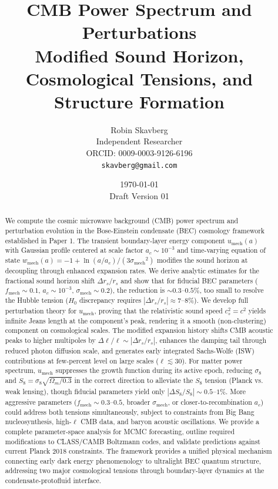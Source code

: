 \documentclass[11pt,a4paper]{article}
\title{\textbf{CMB Power Spectrum and Perturbations}\\[0.5em]
\large Modified Sound Horizon, Cosmological Tensions, and Structure Formation}
\author{Robin Skavberg\\[0.3em]
\small Independent Researcher\\
\small ORCID: 0009-0003-9126-6196\\
\small \texttt{skavberg@gmail.com}}
\date{\today\\[0.5em]
\small Draft Version 01}
\newcommand{\umech}{\ensuremath{u_{\mathrm{mech}}}}
\newcommand{\wmech}{\ensuremath{w_{\mathrm{mech}}}}
\newcommand{\fmech}{\ensuremath{f_{\mathrm{mech}}}}
\newcommand{\ac}{\ensuremath{a_c}}
\newcommand{\sigmamech}{\ensuremath{\sigma_{\mathrm{mech}}}}
\newcommand{\rs}{\ensuremath{r_s}}
\newcommand{\Omm}{\ensuremath{\Omega_m}}
\theoremstyle{definition}
\theoremstyle{remark}
\begin{document}
\maketitle

\begin{abstract}
We compute the cosmic microwave background (CMB) power spectrum and perturbation evolution in the Bose-Einstein condensate (BEC) cosmology framework established in Paper 1. The transient boundary-layer energy component $\umech(a)$ with Gaussian profile centered at scale factor $\ac \sim 10^{-3}$ and time-varying equation of state $\wmech(a) = -1 + \ln(a/\ac)/(3\sigmamech^2)$ modifies the sound horizon at decoupling through enhanced expansion rates. We derive analytic estimates for the fractional sound horizon shift $\Delta\rs/\rs$ and show that for fiducial BEC parameters ($\fmech \sim 0.1$, $\ac \sim 10^{-3}$, $\sigmamech \sim 0.2$), the reduction is $\sim 0.3$--$0.5\%$, too small to resolve the Hubble tension ($H_0$ discrepancy requires $|\Delta\rs/\rs| \approx 7$--$8\%$). We develop full perturbation theory for $\umech$, proving that the relativistic sound speed $c_s^2 = c^2$ yields infinite Jeans length at the component's peak, rendering it a smooth (non-clustering) component on cosmological scales. The modified expansion history shifts CMB acoustic peaks to higher multipoles by $\Delta\ell/\ell \sim |\Delta\rs/\rs|$, enhances the damping tail through reduced photon diffusion scale, and generates early integrated Sachs-Wolfe (ISW) contributions at few-percent level on large scales ($\ell \lesssim 30$). For matter power spectrum, $\umech$ suppresses the growth function during its active epoch, reducing $\sigma_8$ and $S_8 = \sigma_8\sqrt{\Omm/0.3}$ in the correct direction to alleviate the $S_8$ tension (Planck vs. weak lensing), though fiducial parameters yield only $|\Delta S_8/S_8| \sim 0.5$--$1\%$. More aggressive parameters ($\fmech \sim 0.3$--$0.5$, broader $\sigmamech$, or closer-to-recombination $\ac$) could address both tensions simultaneously, subject to constraints from Big Bang nucleosynthesis, high-$\ell$ CMB data, and baryon acoustic oscillations. We provide a complete parameter-space analysis for MCMC forecasting, outline required modifications to CLASS/CAMB Boltzmann codes, and validate predictions against current Planck 2018 constraints. The framework provides a unified physical mechanism connecting early dark energy phenomenology to ultralight BEC quantum structure, addressing two major cosmological tensions through boundary-layer dynamics at the condensate-protofluid interface.
\end{abstract}
\end{document}
